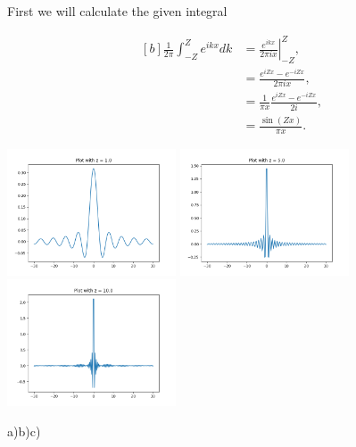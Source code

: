 \begin{questions}
\begin{solution}

First we will calculate the given integral

\begin{equation}
  \begin{aligned}[b]
    \frac{1}{2\pi} \int_{-Z}^Z e^{ikx}dk &= \left.\frac{e^{ikx}}{2\pi ix} \right|_{-Z}^Z ,\\
    &= \frac{e^{iZx} - e^{-iZx}}{2\pi ix},\\
    &= \frac{1}{\pi x}\frac{e^{iZx} - e^{-iZx}}{2i},\\
    &= \frac{\sin(Zx)}{\pi x}.
    \label{int:delt}
  \end{aligned}
\end{equation}

\includegraphics[width=50mm]{delt1.png}
\includegraphics[width=50mm]{delt5.png}
\includegraphics[width=50mm]{delt10.png}\label{del:plots}

\hspace{25mm}a)\hspace{47mm}b)\hspace{48mm}c)

 \vspace{1cm}


\end{solution}
\end{questions}
